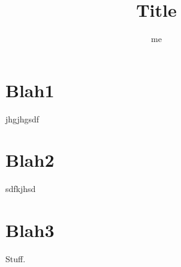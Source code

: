 \documentclass{article}
\title{Title}
\author{me}
\begin{document}
\maketitle
\tableofcontents
\section{Blah1}
jhgjhgsdf
\section{Blah2}
sdfkjhsd
\section{Blah3}
Stuff.
\end{document}
